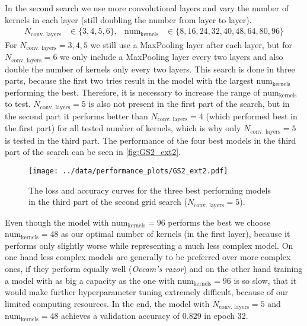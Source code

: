 In the second search we use more convolutional layers and vary the number of kernels in each layer (still doubling the number from layer to layer).
\begin{align}
    N_\text{conv. layers} &\in \{3, 4, 5, 6\}, &
    \text{num}_\text{kernels} &\in \{8, 16, 24, 32, 40, 48, 64, 80, 96\}
\end{align}
For $N_\text{conv. layers} = 3, 4, 5$ we still use a MaxPooling layer after each layer, but for $N_\text{conv. layers} = 6$ we only include a MaxPooling layer every two layers and 
also double the number of kernels only every two layers.
This search is done in three parts, because the first two tries result in the model with the largest $\text{num}_\text{kernels}$ performing the best.
Therefore, it is necessary to increase the range of $\text{num}_\text{kernels}$ to test.
$N_\text{conv. layers} = 5$ is also not present in the first part of the search, but in the second part it performs better than $N_\text{conv. layers} = 4$ (which performed best in the first part)
for all tested number of kernels, which is why only $N_\text{conv. layers} = 5$ is tested in the third part.
The performance of the four best models in the third part of the search can be seen in \autoref{fig:GS2_ext2}.
\begin{figure}
    \centering
    \texttt{[image: ../data/performance\_plots/GS2\_ext2.pdf]}
    \caption{The loss and accuracy curves for the three best performing models in the third part of the second grid search ($N_\text{conv. layers} = 5$).}
    \label{fig:GS2_ext2}
\end{figure}
Even though the model with $\text{num}_\text{kernels} = 96$ performs the best we choose $\text{num}_\text{kernels} = 48$ as our optimal number of kernels (in the first layer),
because it performs only slightly worse while representing a much less complex model. 
On one hand less complex models are generally to be preferred over more complex ones, if they perform equally well (\textit{Occam's razor}) and on the other hand training a model 
with as big a capacity as the one with $\text{num}_\text{kernels} = 96$ is so slow, that it would make further hyperparameter tuning extremely difficult, because of our limited computing resources.
In the end, the model with $N_\text{conv. layers} = 5$ and $\text{num}_\text{kernels} = 48$ achieves a validation accuracy of 0.829 in epoch 32.

